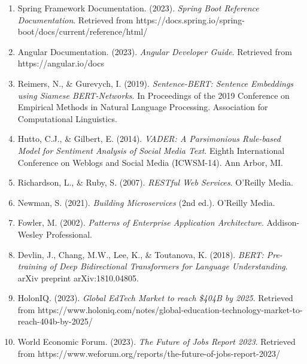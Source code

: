 \documentclass[12pt,a4paper]{report}
\begin{document}
\begin{enumerate}
    \item Spring Framework Documentation. (2023). \textit{Spring Boot Reference Documentation}. Retrieved from https://docs.spring.io/spring-boot/docs/current/reference/html/

    \item Angular Documentation. (2023). \textit{Angular Developer Guide}. Retrieved from https://angular.io/docs

    \item Reimers, N., \& Gurevych, I. (2019). \textit{Sentence-BERT: Sentence Embeddings using Siamese BERT-Networks}. In Proceedings of the 2019 Conference on Empirical Methods in Natural Language Processing. Association for Computational Linguistics.

    \item Hutto, C.J., \& Gilbert, E. (2014). \textit{VADER: A Parsimonious Rule-based Model for Sentiment Analysis of Social Media Text}. Eighth International Conference on Weblogs and Social Media (ICWSM-14). Ann Arbor, MI.

    \item Richardson, L., \& Ruby, S. (2007). \textit{RESTful Web Services}. O'Reilly Media.

    \item Newman, S. (2021). \textit{Building Microservices} (2nd ed.). O'Reilly Media.

    \item Fowler, M. (2002). \textit{Patterns of Enterprise Application Architecture}. Addison-Wesley Professional.

    \item Devlin, J., Chang, M.W., Lee, K., \& Toutanova, K. (2018). \textit{BERT: Pre-training of Deep Bidirectional Transformers for Language Understanding}. arXiv preprint arXiv:1810.04805.

    \item HolonIQ. (2023). \textit{Global EdTech Market to reach \$404B by 2025}. Retrieved from https://www.holoniq.com/notes/global-education-technology-market-to-reach-404b-by-2025/

    \item World Economic Forum. (2023). \textit{The Future of Jobs Report 2023}. Retrieved from https://www.weforum.org/reports/the-future-of-jobs-report-2023/
\end{enumerate}
\end{document}
